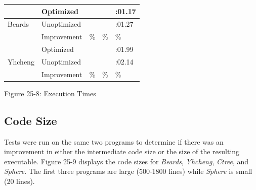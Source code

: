 \begin{center}
\tabletail{}
\tablelasttail{}
\begin{xtabular}{|m{1.1212599in}|m{1.1212599in}|m{1.1212599in}|m{1.1212599in}|m{1.1212599in}|}
\hline
~
 &
 Optimized &
 &
 &
\raggedleft{}:01.17\\\hline
 Beards &
 Unoptimized &
 &
 &
\raggedleft{}:01.27\\\hline
~
 &
 Improvement &
\% &
\% &
\raggedleft{}\%\\\hline
~
 &
 Optimized &
 &
 &
\raggedleft{}:01.99\\\hline
 Yhcheng &
 Unoptimized &
 &
 &
\raggedleft{}:02.14\\\hline
~
 &
 Improvement &
\% &
\% &
\raggedleft{}\%\\\hline
\end{xtabular}
\end{center}
{\centering{}
Figure 25-8: Execution Times
\par}

\subsection{Code Size}

Tests were run on the same two programs to determine if there was an
improvement in either the intermediate code size or the size of the
resulting executable. Figure 25-9 displays the code sizes for
\textit{Beards}, \textit{Yhcheng}, \textit{Ctree}, and
\textit{Sphere}. The first three programs are large (500-1800 lines)
while \textit{Sphere} is small (20 lines).

